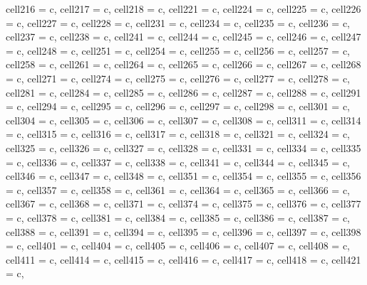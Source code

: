 \begin{longtblr}[
  label = none,
  entry = none,
]
{  cell{21}{6} = {c},
  cell{21}{7} = {c},
  cell{21}{8} = {c},
  cell{22}{1} = {c},
  cell{22}{4} = {c},
  cell{22}{5} = {c},
  cell{22}{6} = {c},
  cell{22}{7} = {c},
  cell{22}{8} = {c},
  cell{23}{1} = {c},
  cell{23}{4} = {c},
  cell{23}{5} = {c},
  cell{23}{6} = {c},
  cell{23}{7} = {c},
  cell{23}{8} = {c},
  cell{24}{1} = {c},
  cell{24}{4} = {c},
  cell{24}{5} = {c},
  cell{24}{6} = {c},
  cell{24}{7} = {c},
  cell{24}{8} = {c},
  cell{25}{1} = {c},
  cell{25}{4} = {c},
  cell{25}{5} = {c},
  cell{25}{6} = {c},
  cell{25}{7} = {c},
  cell{25}{8} = {c},
  cell{26}{1} = {c},
  cell{26}{4} = {c},
  cell{26}{5} = {c},
  cell{26}{6} = {c},
  cell{26}{7} = {c},
  cell{26}{8} = {c},
  cell{27}{1} = {c},
  cell{27}{4} = {c},
  cell{27}{5} = {c},
  cell{27}{6} = {c},
  cell{27}{7} = {c},
  cell{27}{8} = {c},
  cell{28}{1} = {c},
  cell{28}{4} = {c},
  cell{28}{5} = {c},
  cell{28}{6} = {c},
  cell{28}{7} = {c},
  cell{28}{8} = {c},
  cell{29}{1} = {c},
  cell{29}{4} = {c},
  cell{29}{5} = {c},
  cell{29}{6} = {c},
  cell{29}{7} = {c},
  cell{29}{8} = {c},
  cell{30}{1} = {c},
  cell{30}{4} = {c},
  cell{30}{5} = {c},
  cell{30}{6} = {c},
  cell{30}{7} = {c},
  cell{30}{8} = {c},
  cell{31}{1} = {c},
  cell{31}{4} = {c},
  cell{31}{5} = {c},
  cell{31}{6} = {c},
  cell{31}{7} = {c},
  cell{31}{8} = {c},
  cell{32}{1} = {c},
  cell{32}{4} = {c},
  cell{32}{5} = {c},
  cell{32}{6} = {c},
  cell{32}{7} = {c},
  cell{32}{8} = {c},
  cell{33}{1} = {c},
  cell{33}{4} = {c},
  cell{33}{5} = {c},
  cell{33}{6} = {c},
  cell{33}{7} = {c},
  cell{33}{8} = {c},
  cell{34}{1} = {c},
  cell{34}{4} = {c},
  cell{34}{5} = {c},
  cell{34}{6} = {c},
  cell{34}{7} = {c},
  cell{34}{8} = {c},
  cell{35}{1} = {c},
  cell{35}{4} = {c},
  cell{35}{5} = {c},
  cell{35}{6} = {c},
  cell{35}{7} = {c},
  cell{35}{8} = {c},
  cell{36}{1} = {c},
  cell{36}{4} = {c},
  cell{36}{5} = {c},
  cell{36}{6} = {c},
  cell{36}{7} = {c},
  cell{36}{8} = {c},
  cell{37}{1} = {c},
  cell{37}{4} = {c},
  cell{37}{5} = {c},
  cell{37}{6} = {c},
  cell{37}{7} = {c},
  cell{37}{8} = {c},
  cell{38}{1} = {c},
  cell{38}{4} = {c},
  cell{38}{5} = {c},
  cell{38}{6} = {c},
  cell{38}{7} = {c},
  cell{38}{8} = {c},
  cell{39}{1} = {c},
  cell{39}{4} = {c},
  cell{39}{5} = {c},
  cell{39}{6} = {c},
  cell{39}{7} = {c},
  cell{39}{8} = {c},
  cell{40}{1} = {c},
  cell{40}{4} = {c},
  cell{40}{5} = {c},
  cell{40}{6} = {c},
  cell{40}{7} = {c},
  cell{40}{8} = {c},
  cell{41}{1} = {c},
  cell{41}{4} = {c},
  cell{41}{5} = {c},
  cell{41}{6} = {c},
  cell{41}{7} = {c},
  cell{41}{8} = {c},
  cell{42}{1} = {c},
}
\end{longtblr}
